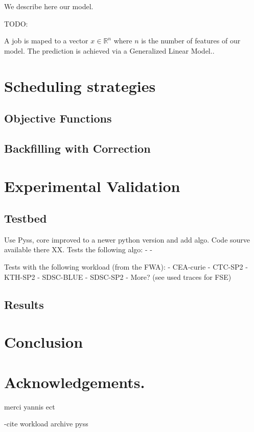 \documentclass{llncs}
\begin{document}
We describe here our model.

TODO:

A job is maped to a vector $x \in \mathbb{R}^{n}$ where $n$ is the number of features of our model.
The prediction is achieved via a Generalized Linear Model..




\section{Scheduling strategies}
\label{sec:scheduling_strategies}

\subsection{Objective Functions}
\label{sub:objective_functions}

\subsection{Backfilling with Correction}
\label{sub:backfilling_with_correction}





\section{Experimental Validation}
\label{sec:experimental_validation}

\subsection{Testbed}
\label{sub:Testbed}
Use Pyss, core improved to a newer python version and add algo. Code sourve available there XX.
Tests the following algo:
- 
- 

Tests with the following workload (from the FWA):
- CEA-curie
- CTC-SP2
- KTH-SP2
- SDSC-BLUE
- SDSC-SP2
- More? (see used traces for FSE)


\subsection{Results}
\label{sub:Testbed}




\section{Conclusion}
\label{sec:conclusion}





\section*{Acknowledgements.}
\label{sec:ack}
merci yannis ect

-cite
workload archive
pyss




\end{document}
